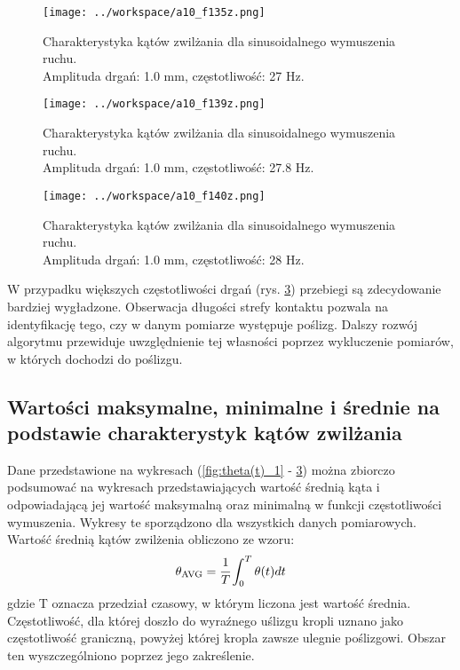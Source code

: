 \documentclass[a4paper,11pt,twoside,openright]{article} %
\begin{document}
\captionsetup{skip=0pt}
\begin{figure}[!h]
\captionsetup{justification=centering}
\begin{center}
\texttt{[image: ../workspace/a10\_f135z.png]} 
\end{center}
\caption{Charakterystyka kątów zwilżania dla sinusoidalnego wymuszenia ruchu.  \\Amplituda drgań: 1.0 mm,  częstotliwość: 27 Hz.}
\label{fig:theta(t)_5}
\end{figure} 
\newpage

\captionsetup{skip=0pt}
\begin{figure}[!h]
\captionsetup{justification=centering}
\begin{center}
\texttt{[image: ../workspace/a10\_f139z.png]} 
\end{center}
\caption{Charakterystyka kątów zwilżania dla sinusoidalnego wymuszenia ruchu.  \\Amplituda drgań: 1.0 mm,  częstotliwość: 27.8 Hz.}
\label{fig:theta(t)_6}
\end{figure} 

\captionsetup{skip=0pt}
\begin{figure}[!h]
\captionsetup{justification=centering}
\begin{center}
\texttt{[image: ../workspace/a10\_f140z.png]} 
\end{center}
\caption{Charakterystyka kątów zwilżania dla sinusoidalnego wymuszenia ruchu.  \\Amplituda drgań: 1.0 mm,  częstotliwość: 28 Hz.}
\label{fig:theta(t)_7}
\end{figure} 

\vspace{5mm}
\noindent W przypadku większych częstotliwości drgań (rys. \ref{fig:theta(t)_7}) przebiegi są zdecydowanie bardziej wygładzone. Obserwacja długości strefy kontaktu pozwala na identyfikację tego, czy w danym pomiarze występuje poślizg. Dalszy rozwój algorytmu przewiduje uwzględnienie tej własności poprzez wykluczenie pomiarów, w których dochodzi do poślizgu. 
\newpage

\subsection{Wartości maksymalne, minimalne i średnie na podstawie charakterystyk kątów zwilżania}
\noindent Dane przedstawione na wykresach (\ref{fig:theta(t)_1} - \ref{fig:theta(t)_7}) można zbiorczo podsumować na wykresach przedstawiających wartość średnią kąta i odpowiadającą jej wartość maksymalną oraz minimalną w funkcji częstotliwości wymuszenia. Wykresy te sporządzono dla wszystkich danych pomiarowych. Wartość średnią kątów zwilżenia obliczono ze wzoru:
\begin{equation}
\theta_{\text{AVG}} = \cfrac{1}{T} \int_0^T \theta(t) dt
\end{equation}
\noindent gdzie T oznacza przedział czasowy, w którym liczona jest wartość średnia. Częstotliwość, dla której doszło do wyraźnego uślizgu kropli uznano jako częstotliwość graniczną, powyżej której kropla zawsze ulegnie poślizgowi. Obszar ten wyszczególniono poprzez jego zakreślenie. 
\end{document}
